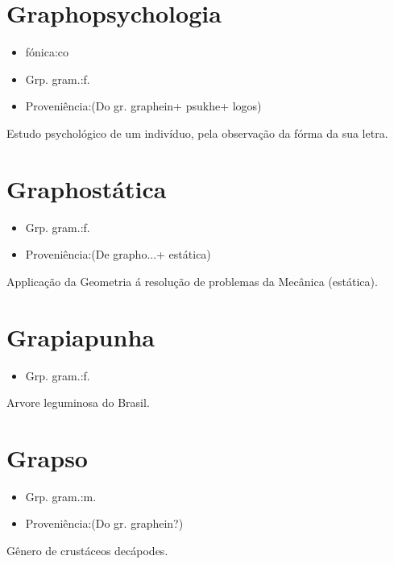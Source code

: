 \section{Graphopsychologia}
\begin{itemize}
\item {fónica:co}
\end{itemize}
\begin{itemize}
\item {Grp. gram.:f.}
\end{itemize}
\begin{itemize}
\item {Proveniência:(Do gr. \textunderscore graphein\textunderscore  + \textunderscore psukhe\textunderscore  + \textunderscore logos\textunderscore )}
\end{itemize}
Estudo psychológico de um indivíduo, pela observação da fórma da sua letra.
\section{Graphostática}
\begin{itemize}
\item {Grp. gram.:f.}
\end{itemize}
\begin{itemize}
\item {Proveniência:(De \textunderscore grapho...\textunderscore  + \textunderscore estática\textunderscore )}
\end{itemize}
Applicação da Geometria á resolução de problemas da Mecânica (estática).
\section{Grapiapunha}
\begin{itemize}
\item {Grp. gram.:f.}
\end{itemize}
Arvore leguminosa do Brasil.
\section{Grapso}
\begin{itemize}
\item {Grp. gram.:m.}
\end{itemize}
\begin{itemize}
\item {Proveniência:(Do gr. \textunderscore graphein\textunderscore ?)}
\end{itemize}
Gênero de crustáceos decápodes.
